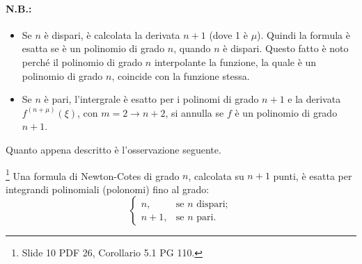 \paragraph{N.B.:}
\begin{itemize}
	\item Se $n$ è dispari, è calcolata la derivata $n+1$ (dove 1 è $\mu$). Quindi la formula è esatta se è un polinomio di grado $n$, quando $n$ è dispari. Questo fatto è noto perché il polinomio di grado $n$ interpolante la funzione, la quale è un polinomio di grado $n$, coincide con la funzione stessa.
	\item Se $n$ è pari, l'intergrale è esatto per i polinomi di grado $n+1$ e la derivata $f^{(n+\mu)}(\xi)$, con $m=2\rightarrow n+2$, si annulla se $f$ è un polinomio di grado $n+1$.
\end{itemize}
Quanto appena descritto è l'osservazione seguente.

\begin{remark}
    \footnote{Slide 10 PDF 26, Corollario 5.1 PG 110.} Una formula di Newton-Cotes di grado $n$, calcolata su $n+1$ punti, è esatta per integrandi polinomiali (polonomi) fino al grado:
    \begin{equation*}
        \begin{cases}
            n, &\text{se $n$ dispari};\\
            n+1, &\text{se $n$ pari}.
        \end{cases}
    \end{equation*}
\end{remark}

